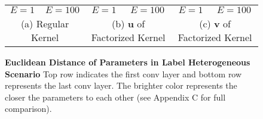 \begin{figure*}[t]
\begin{tabular}{c c c c c c}
        
        \hspace{-0.1in} $E=1$ &
        \hspace{-0.1in} $E=100$ &
        \hspace{-0.05in} $E=1$ &
        \hspace{-0.05in} $E=100$ &
        \hspace{-0.05in} $E=1$ &
        \hspace{-0.05in} $E=100$ \\
        
        \multicolumn{2}{c}{(a) Regular Kernel } &
        \multicolumn{2}{c}{(b) $\textbf{u}$ of Factorized Kernel}  &
        \multicolumn{2}{c}{(c) $\textbf{v}$ of Factorized Kernel}
        
    \end{tabular}
    \vspace{-0.1in}
    \caption{\small{\textbf{Euclidean Distance of Parameters in Label Heterogeneous Scenario}} Top row indicates the first conv layer and bottom row represents the last conv layer. The brighter color represents the closer the parameters to each other (see Appendix C for full comparison). }
    \label{fig:distance}
    \vspace{-0.1in}
\end{figure*}
